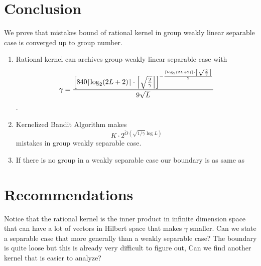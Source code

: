 \justify


\section{Conclusion}
We prove that mistakes bound of rational kernel in 
group weakly linear separable case is converged up to group number.
\begin{enumerate}
    \item Rational kernel can archives group weakly linear separable case with
$$
\gamma = \my_gamma
$$.
    \item Kernelized Bandit Algorithm makes 
$$
K\cdot 2^{\tilde{O}(\sqrt{1/\gamma}\log L)}
$$
mistakes in group weakly separable case.
    \item If there is no group in a weakly separable case our boundary is as same as
\cite{BeygelzimerPSTWZ2019-separable}
\end{enumerate}

\section{Recommendations}

Notice that the rational kernel is the inner product in infinite dimension space
that can have a lot of vectors in Hilbert space that makes $\gamma$ smaller.
Can we state a separable case that more generally than a weakly separable case?
The boundary is quite loose but this is already very difficult to figure out, 
Can we find another kernel that is easier to analyze?